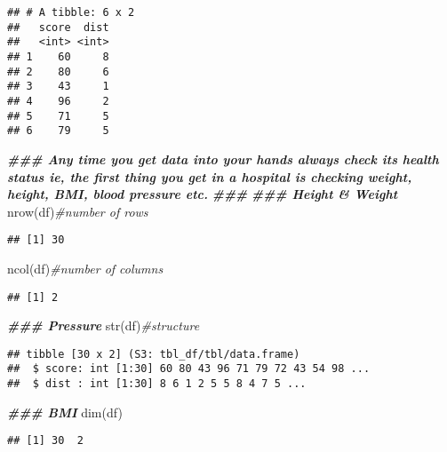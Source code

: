 \documentclass[
]{book}
\newenvironment{Shaded}{\begin{snugshade}}{\end{snugshade}}
\newcommand{\CommentTok}[1]{\textcolor[rgb]{0.56,0.35,0.01}{\textit{#1}}}
\newcommand{\DocumentationTok}[1]{\textcolor[rgb]{0.56,0.35,0.01}{\textbf{\textit{#1}}}}
\newcommand{\FunctionTok}[1]{\textcolor[rgb]{0.00,0.00,0.00}{#1}}
\newcommand{\NormalTok}[1]{#1}
\begin{document}
\begin{verbatim}
## # A tibble: 6 x 2
##   score  dist
##   <int> <int>
## 1    60     8
## 2    80     6
## 3    43     1
## 4    96     2
## 5    71     5
## 6    79     5
\end{verbatim}

\begin{Shaded}
\begin{Highlighting}[]
\DocumentationTok{\#\#\# Any time you get data into your hands always check its health status ie, the first thing you get in a hospital is checking weight, height, BMI, blood pressure etc.}
\DocumentationTok{\#\#\# }
\DocumentationTok{\#\#\# Height \& Weight}
\FunctionTok{nrow}\NormalTok{(df)}\CommentTok{\#number of rows}
\end{Highlighting}
\end{Shaded}

\begin{verbatim}
## [1] 30
\end{verbatim}

\begin{Shaded}
\begin{Highlighting}[]
\FunctionTok{ncol}\NormalTok{(df)}\CommentTok{\#number of columns}
\end{Highlighting}
\end{Shaded}

\begin{verbatim}
## [1] 2
\end{verbatim}

\begin{Shaded}
\begin{Highlighting}[]
\DocumentationTok{\#\#\# Pressure}
\FunctionTok{str}\NormalTok{(df)}\CommentTok{\#structure}
\end{Highlighting}
\end{Shaded}

\begin{verbatim}
## tibble [30 x 2] (S3: tbl_df/tbl/data.frame)
##  $ score: int [1:30] 60 80 43 96 71 79 72 43 54 98 ...
##  $ dist : int [1:30] 8 6 1 2 5 5 8 4 7 5 ...
\end{verbatim}

\begin{Shaded}
\begin{Highlighting}[]
\DocumentationTok{\#\#\# BMI}
\FunctionTok{dim}\NormalTok{(df) }
\end{Highlighting}
\end{Shaded}

\begin{verbatim}
## [1] 30  2
\end{verbatim}
\end{document}
